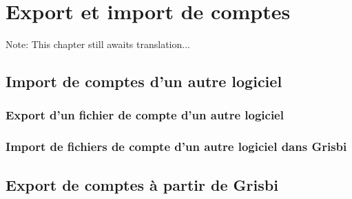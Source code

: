 

\chapter{Export et import de comptes\label{move}}

Note: This chapter still awaits translation...


\section{Import de comptes d'un autre logiciel\label{move-import}}


\subsection{Export d'un fichier de compte d'un autre logiciel\label{move-import-exportinit}}

\subsection{Import de fichiers de compte d'un autre logiciel dans Grisbi\label{move-import-importinit}}



\section{Export de comptes à partir de Grisbi\label{move-export}}













